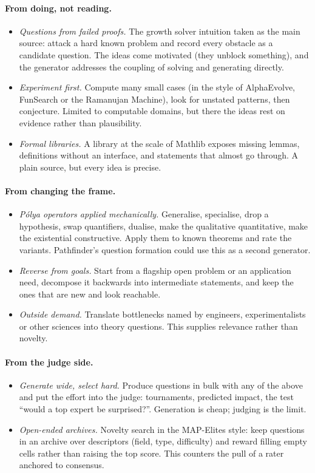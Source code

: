 \documentclass[10pt]{article}
\begin{document}
\paragraph{From doing, not reading.}
\begin{itemize}
  \item \emph{Questions from failed proofs.} The growth solver intuition taken as the main source: attack a hard
  known problem and record every obstacle as a candidate question. The ideas come motivated (they unblock
  something), and the generator addresses the coupling of solving and generating directly.
  \item \emph{Experiment first.} Compute many small cases (in the style of AlphaEvolve, FunSearch or the Ramanujan
  Machine), look for unstated patterns, then conjecture. Limited to computable domains, but there the ideas rest on
  evidence rather than plausibility.
  \item \emph{Formal libraries.} A library at the scale of Mathlib exposes missing lemmas, definitions without an
  interface, and statements that almost go through. A plain source, but every idea is precise.
\end{itemize}

\paragraph{From changing the frame.}
\begin{itemize}
  \item \emph{P\'olya operators applied mechanically.} Generalise, specialise, drop a hypothesis, swap quantifiers,
  dualise, make the qualitative quantitative, make the existential constructive. Apply them to known theorems and
  rate the variants. Pathfinder's question formation could use this as a second generator.
  \item \emph{Reverse from goals.} Start from a flagship open problem or an application need, decompose it
  backwards into intermediate statements, and keep the ones that are new and look reachable.
  \item \emph{Outside demand.} Translate bottlenecks named by engineers, experimentalists or other sciences into
  theory questions. This supplies relevance rather than novelty.
\end{itemize}

\paragraph{From the judge side.}
\begin{itemize}
  \item \emph{Generate wide, select hard.} Produce questions in bulk with any of the above and put the effort into
  the judge: tournaments, predicted impact, the test ``would a top expert be surprised?''. Generation is cheap;
  judging is the limit.
  \item \emph{Open-ended archives.} Novelty search in the MAP-Elites style: keep questions in an archive over
  descriptors (field, type, difficulty) and reward filling empty cells rather than raising the top score. This
  counters the pull of a rater anchored to consensus.
\end{itemize}
\end{document}
